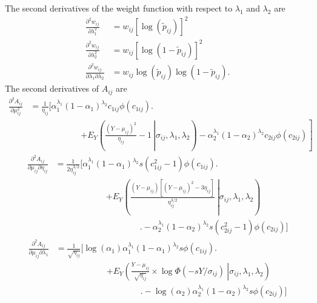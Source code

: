 \documentclass[
  american,
  man, donotrepeattitle,floatsintext]{apa7}
\begin{document}
The second derivatives of the weight function with respect to \(\lambda_1\) and \(\lambda_2\) are
\begin{align}
\frac{\partial^2 w_{ij}}{\partial \lambda_1^2} &= w_{ij} \left[\log(\tilde{p}_{ij})\right]^2 \\
\frac{\partial^2 w_{ij}}{\partial \lambda_2^2} &=  w_{ij} \left[\log(1 - \tilde{p}_{ij})\right]^2 \\
\frac{\partial^2 w_{ij}}{\partial \lambda_1 \partial \lambda_2} &=  w_{ij} \log(\tilde{p}_{ij})\log(1 - \tilde{p}_{ij}).
\end{align}
The second derivatives of \(A_{ij}\) are
\begin{align}
\frac{\partial^2 A_{ij}}{\partial \mu_{ij}^2} &= \frac{1}{\eta_{ij}} \biggl[ \alpha_1^{\lambda_1}(1 - \alpha_1)^{\lambda_2} c_{1ij} \phi(c_{1ij}) \biggr. \nonumber \\
& \qquad \qquad \qquad \left. + E_Y\left(\left.\frac{(Y - \mu_{ij})^2}{\eta_{ij}} - 1 \ \right| \sigma_{ij}, \lambda_1, \lambda_2 \right) - \alpha_2^{\lambda_1} (1 - \alpha_2)^{\lambda_2} c_{2ij} \phi(c_{2ij}) \right]
\end{align}
\begin{align}
\frac{\partial^2 A_{ij}}{\partial \mu_{ij} \partial \eta_{ij}} &= \frac{1}{2 \eta_{ij}^{3/2}} \biggl[  \alpha_1^{\lambda_1}(1 - \alpha_1)^{\lambda_2} s(c_{1ij}^2 - 1) \phi(c_{1ij}) \biggr. \nonumber \\
& \qquad \qquad \qquad \left. + E_Y\left(\left.\frac{(Y - \mu_{ij})[(Y - \mu_{ij})^2 - 3 \eta_{ij}]}{\eta_{ij}^{3/2}} \ \right| \sigma_{ij}, \lambda_1, \lambda_2 \right) \right. \nonumber \\ 
& \qquad \qquad \qquad \qquad \qquad \biggl. - \alpha_2^{\lambda_1} (1 - \alpha_2)^{\lambda_2} s(c_{2ij}^2 - 1) \phi(c_{2ij}) \biggr]
\end{align}
\begin{align}
\frac{\partial^2 A_{ij}}{\partial \mu_{ij} \partial \lambda_1} &= \frac{1}{\sqrt{\eta_{ij}}} \biggl[\log(\alpha_1) \alpha_1^{\lambda_1} (1 - \alpha_1)^{\lambda_2} s \phi(c_{1ij}) \biggr. \nonumber \\
& \qquad \qquad \qquad \left. + E_Y\left(\left.\frac{Y - \mu_{ij}}{\sqrt{\eta_{ij}}} \times \log \Phi(-s Y / \sigma_{ij}) \ \right| \sigma_{ij}, \lambda_1,\lambda_2\right) \right. \nonumber \\ 
& \qquad \qquad \qquad \qquad \qquad \biggl. - \log(\alpha_2) \alpha_2^{\lambda_1} (1 - \alpha_2)^{\lambda_2} s \phi(c_{2ij}) \biggr]
\end{align}
\end{document}
